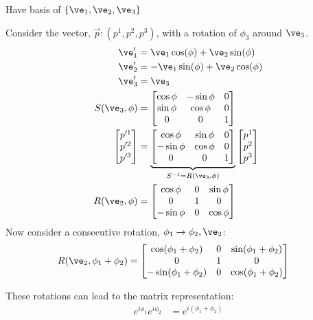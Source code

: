 \documentclass[cplx.tex]{subfiles}
\begin{document}
\begin{example}[3D Rotations]
    Have basis of $\{\ve_1,\ve_2,\ve_3\}$

    Consider the vector, $\vec{p}: (p^1,p^2,p^3)$, with a rotation of $\phi_3$ around $\ve_3$.
    \begin{align}
        \ve'_1 &= \ve_1\cos(\phi) + \ve_2\sin(\phi) \\
        \ve'_2 &= -\ve_1\sin(\phi) + \ve_2\cos(\phi) \\
        \ve'_3 &= \ve_3 \\
        S(\ve_3,\phi) &= \begin{bmatrix} \cos\phi & -\sin\phi & 0 \\ \sin\phi & \cos\phi & 0 \\ 0 & 0 & 1 \end{bmatrix} \\
        \begin{bmatrix} p'^1 \\ p'^2 \\ p'^3 \end{bmatrix} &= \underbrace{\begin{bmatrix} \cos\phi & \sin\phi & 0 \\ -\sin\phi & \cos\phi & 0 \\ 0 & 0 & 1 \end{bmatrix}}_{S^{-1} = R(\ve_3,\phi)} \begin{bmatrix} p^1 \\ p^2 \\ p^3 \end{bmatrix} \\
        R(\ve_2,\phi) &= \begin{bmatrix} \cos\phi & 0 & \sin\phi \\ 0 & 1 & 0 \\ -\sin\phi & 0 & \cos\phi \end{bmatrix}
    \end{align}
    Now consider a consecutive rotation, $\phi_1 \to \phi_2, \ve_2$:
    \begin{align}
        R(\ve_2,\phi_1+\phi_2) &= \begin{bmatrix} \cos(\phi_1+\phi_2) & 0 & \sin(\phi_1+\phi_2) \\ 0 & 1 & 0 \\ -\sin(\phi_1+\phi_2) & 0 & \cos(\phi_1+\phi_2) \end{bmatrix}
    \end{align}
\end{example}
These rotations can lead to the matrix representation: 
\begin{align}
    e^{i\phi_1}e^{i\phi_2} &= e^{i(\phi_1+\phi_2)}
\end{align}
\end{document}

